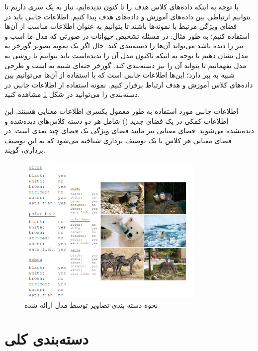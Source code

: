 با توجه به اینکه داده‌های کلاس هدف را تا کنون ندیده‌ایم، نیاز به یک سری 
 داریم تا بتوانیم ارتباطی بین داده‌های آموزش و داده‌های هدف پیدا کنیم. اطلاعات جانبی باید در فضای ویژگی مرتبط با نمونه‌ها باشند تا بتوانیم به عنوان اطلاعات مناسب از آن‌ها استفاده کنیم؛ به طور مثال: در مسئله تشخیص حیوانات در صورتی که مدل ما اسب و ببر را دیده باشد می‌تواند آن‌ها را دسته‌بندی کند. حال اگر یک نمونه تصویر گورخر به مدل نشان دهیم با توجه به اینکه تاکنون مدل آن‌ را ندیده‌است باید بتوانیم با روشی به مدل بفهمانیم تا بتواند آن را نیز دسته‌بندی کند. گورخر جثه‌ای شبیه به اسب و طرحی شبیه به ببر دارد؛ این‌ها اطلاعات جانبی است که با استقاده از آن‌ها می‌توانیم بین داده‌های کلاس آموزش و هدف ارتباط برقرار کنیم. نمونه استفاده از اطلاعات جانبی در دسته‌بندی را می‌توانید در شکل
 \ref{fig:attribute infromation}
 مشاهده کنید.
 
اطلاعات جانبی مورد استفاده به طور معمول یکسری اطلاعات معنایی  هستند. این اطلاعات کمکی در یک فضای جدید 
()
 شامل هر دو دسته کلاس‌های دیده‌شده و دیده‌نشده می‌شوند. فضای معنایی نیز مانند فضای ویژگی یک فضای چند بعدی است. در فضای معنایی هر کلاس با یک توصیف برداری شناخته می‌شود که به این توصبف برداری،  
 گویند. 
 
\begin{figure}[h]
	\centering
	\includegraphics[width=0.8\textwidth]{img/report/sample}
	\caption{نحوه دسته بندی تصاویر توسط مدل ارائه شده \cite{Lampert2014}}
	\label{fig:attribute infromation}
	\centering
\end{figure}

\section{دسته‌بندی کلی}

